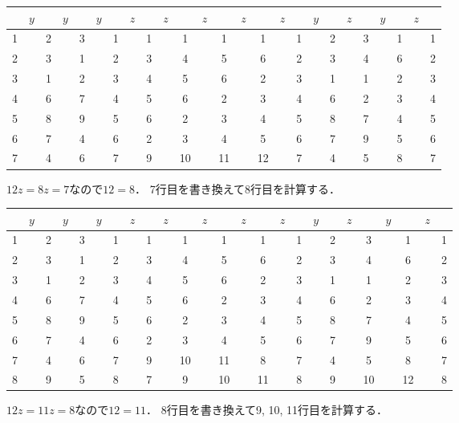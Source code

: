 \documentclass[a4paper]{ltjsreport}
\begin{document}
\begin{center}
  \begin{tabular}{c|cccccc|cccccccccc|cccccccc}
    & $y$ && $y$ && $y$ && $z$ && $z$ && $z$ && $z$ && $z$ && $y$ && $z$ && $y$ && $z$ & \\ \hline
    1 && 2 && 3 && 1 && 1 && 1 && 1 && 1 && 1 && 2 && 3 && 1 && 1 \\
    2 && 3 && 1 && 2 && 3 && 4 && 5 && 6 && 2 && 3 && 4 && 6 && 2 \\
    3 && 1 && 2 && 3 && 4 && 5 && 6 && 2 && 3 && 1 && 1 && 2 && 3 \\
    4 && 6 && 7 && 4 && 5 && 6 && 2 && 3 && 4 && 6 && 2 && 3 && 4 \\
    5 && 8 && 9 && 5 && 6 && 2 && 3 && 4 && 5 && 8 && 7 && 4 && 5 \\
    6 && 7 && 4 && 6 && 2 && 3 && 4 && 5 && 6 && 7 && 9 && 5 && 6 \\
    7 && 4 && 6 && 7 && 9 && 10 && 11 && 12 && 7 && 4 && 5 && 8 && 7
  \end{tabular}
\end{center}
$12z = 8z = 7$なので$12 = 8$．
7行目を書き換えて8行目を計算する．

\begin{center}
  \begin{tabular}{c|cccccc|cccccccccc|cccccccc}
    & $y$ && $y$ && $y$ && $z$ && $z$ && $z$ && $z$ && $z$ && $y$ && $z$ && $y$ && $z$ & \\ \hline
    1 && 2 && 3 && 1 && 1 && 1 && 1 && 1 && 1 && 2 && 3 && 1 && 1 \\
    2 && 3 && 1 && 2 && 3 && 4 && 5 && 6 && 2 && 3 && 4 && 6 && 2 \\
    3 && 1 && 2 && 3 && 4 && 5 && 6 && 2 && 3 && 1 && 1 && 2 && 3 \\
    4 && 6 && 7 && 4 && 5 && 6 && 2 && 3 && 4 && 6 && 2 && 3 && 4 \\
    5 && 8 && 9 && 5 && 6 && 2 && 3 && 4 && 5 && 8 && 7 && 4 && 5 \\
    6 && 7 && 4 && 6 && 2 && 3 && 4 && 5 && 6 && 7 && 9 && 5 && 6 \\
    7 && 4 && 6 && 7 && 9 && 10 && 11 && 8 && 7 && 4 && 5 && 8 && 7 \\
    8 && 9 && 5 && 8 && 7 && 9 && 10 && 11 && 8 && 9 && 10 && 12 && 8
  \end{tabular}
\end{center}
$12z = 11z = 8$なので$12 = 11$．
8行目を書き換えて9, 10, 11行目を計算する．
\end{document}
